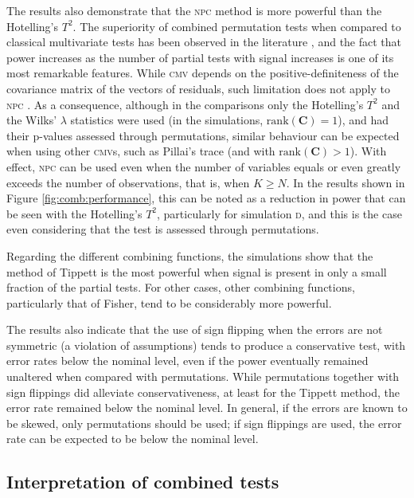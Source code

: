 The results also demonstrate that the \textsc{npc} method is more powerful than the Hotelling's $T^2$. The superiority of combined permutation tests when compared to classical multivariate tests has been observed in the literature \citep{Blair1994}, and the fact that power increases as the number of partial tests with signal increases is one of its most remarkable features. While \textsc{cmv} depends on the positive-definiteness of the covariance matrix of the vectors of residuals, such limitation does not apply to \textsc{npc} \citep{Pesarin2010_finite}. As a consequence, although in the comparisons only the Hotelling's $T^2$ and the Wilks' $\lambda$ statistics were used (in the simulations, $\mathrm{rank}\left(\mathbf{C}\right) = 1$), and had their p-values assessed through permutations, similar behaviour can be expected when using other \textsc{cmv}s, such as Pillai's trace (and with $\mathrm{rank}\left(\mathbf{C}\right) > 1$). With effect, \textsc{npc} can be used even when the number of variables equals or even greatly exceeds the number of observations, that is, when $K \geqslant N$. In the results shown in Figure \ref{fig:comb:performance}, this can be noted as a reduction in power that can be seen with the Hotelling's $T^2$, particularly for simulation \textsc{d}, and this is the case even considering that the test is assessed through permutations.

Regarding the different combining functions, the simulations show that the method of Tippett is the most powerful when signal is present in only a small fraction of the partial tests. For other cases, other combining functions, particularly that of Fisher, tend to be considerably more powerful.

The results also indicate that the use of sign flipping when the errors are not symmetric (a violation of assumptions) tends to produce a conservative test, with error rates below the nominal level, even if the power eventually remained unaltered when compared with permutations. While permutations together with sign flippings did alleviate conservativeness, at least for the Tippett method, the error rate remained below the nominal level. In general, if the errors are known to be skewed, only permutations should be used; if sign flippings are used, the error rate can be expected to be below the nominal level.

\subsection{Interpretation of combined tests}

